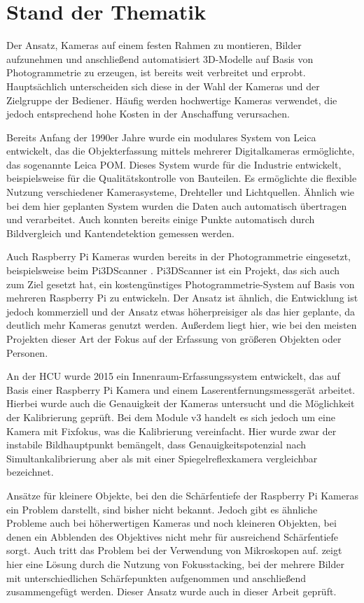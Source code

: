 \documentclass[./00PhotoBox]{subfiles}
\begin{document}
\section{Stand der Thematik}
Der Ansatz, Kameras auf einem festen Rahmen zu montieren, Bilder aufzunehmen und anschließend automatisiert 3D-Modelle auf Basis von Photogrammetrie zu erzeugen, ist bereits weit verbreitet und erprobt. Hauptsächlich unterscheiden sich diese in der Wahl der Kameras und der Zielgruppe der Bediener. Häufig werden hochwertige Kameras verwendet, die jedoch entsprechend hohe Kosten in der Anschaffung verursachen.

Bereits Anfang der 1990er Jahre wurde ein modulares System von Leica entwickelt, das die Objekterfassung mittels mehrerer Digitalkameras ermöglichte, das sogenannte Leica POM.  Dieses System wurde für die Industrie entwickelt, beispielsweise für die Qualitätskontrolle von Bauteilen. Es ermöglichte die flexible Nutzung verschiedener Kamerasysteme, Drehteller und Lichtquellen. Ähnlich wie bei dem hier geplanten System wurden die Daten auch automatisch übertragen und verarbeitet. Auch konnten bereits einige Punkte automatisch durch Bildvergleich und Kantendetektion gemessen werden.
\citep{leica_pom_concept}

Auch Raspberry Pi Kameras wurden bereits in der Photogrammetrie eingesetzt, beispielsweise beim Pi3DScanner \citep{pi3dscanner}. Pi3DScanner ist ein Projekt, das sich auch zum Ziel gesetzt hat, ein kostengünstiges Photo\-gram\-metrie-System auf Basis von mehreren Raspberry Pi zu entwickeln. Der Ansatz ist ähnlich, die Entwicklung ist jedoch kommerziell und der Ansatz etwas höherpreisiger als das hier geplante, da deutlich mehr Kameras genutzt werden. Außerdem liegt hier, wie bei den meisten Projekten dieser Art der Fokus auf der Erfassung von größeren Objekten oder Personen.
\citep{pi3dscanner}

An der HCU wurde 2015 ein Innenraum-Erfassungssystem entwickelt, das auf Basis einer Raspberry Pi Kamera und einem Laserentfernungsmessgerät arbeitet. Hierbei wurde auch die Genauigkeit der Kameras untersucht und die Möglichkeit der Kalibrierung geprüft. Bei dem Module v3 handelt es sich jedoch um eine Kamera mit Fixfokus, was die Kalibrierung vereinfacht. Hier wurde zwar der instabile Bildhauptpunkt bemängelt, dass Genauigkeitspotenzial nach Simultankalibrierung aber als mit einer Spiegelreflexkamera vergleichbar bezeichnet.
\citep{3d_raspi_laserscanner}

Ansätze für kleinere Objekte, bei den die Schärfentiefe der Raspberry Pi Kameras ein Problem darstellt, sind bisher nicht bekannt. Jedoch gibt es ähnliche Probleme auch bei höherwertigen Kameras und noch kleineren Objekten, bei denen ein Abblenden des Objektives nicht mehr für ausreichend Schärfentiefe sorgt. Auch tritt das Problem bei der Verwendung von Mikroskopen auf. \cite{focusstack_sfm} zeigt hier eine Lösung durch die Nutzung von Fokusstacking, bei der mehrere Bilder mit unterschiedlichen Schärfepunkten aufgenommen und anschließend zusammengefügt werden. Dieser Ansatz wurde auch in dieser Arbeit geprüft.




\biblio
\end{document}
